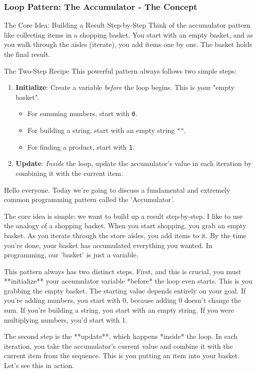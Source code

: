 \documentclass{beamer}
\begin{document}
\begin{frame}[fragile]
    \frametitle{Loop Pattern: The Accumulator - The Concept}
    \begin{block}{The Core Idea: Building a Result Step-by-Step}
        Think of the accumulator pattern like collecting items in a shopping basket. You start with an empty basket, and as you walk through the aisles (iterate), you add items one by one. The basket holds the final result.
    \end{block}

    \vfill

    \begin{block}{The Two-Step Recipe}
        This powerful pattern always follows two simple steps:
        \begin{enumerate}
            \item \textbf{Initialize}: Create a variable \textit{before} the loop begins. This is your "empty basket".
            \begin{itemize}
                \item For summing numbers, start with \texttt{0}.
                \item For building a string, start with an empty string \texttt{""}.
                \item For finding a product, start with \texttt{1}.
            \end{itemize}
            \item \textbf{Update}: \textit{Inside} the loop, update the accumulator's value in each iteration by combining it with the current item.
        \end{enumerate}
    \end{block}

    \begin{note}
    Hello everyone. Today we're going to discuss a fundamental and extremely common programming pattern called the 'Accumulator'.
    
    The core idea is simple: we want to build up a result step-by-step. I like to use the analogy of a shopping basket. When you start shopping, you grab an empty basket. As you iterate through the store aisles, you add items to it. By the time you're done, your basket has accumulated everything you wanted. In programming, our 'basket' is just a variable.
    
    This pattern always has two distinct steps. First, and this is crucial, you must **initialize** your accumulator variable *before* the loop even starts. This is you grabbing the empty basket. The starting value depends entirely on your goal. If you're adding numbers, you start with 0, because adding 0 doesn't change the sum. If you're building a string, you start with an empty string. If you were multiplying numbers, you'd start with 1.
    
    The second step is the **update**, which happens *inside* the loop. In each iteration, you take the accumulator's current value and combine it with the current item from the sequence. This is you putting an item into your basket. Let's see this in action.
    \end{note}
\end{frame}
\end{document}
